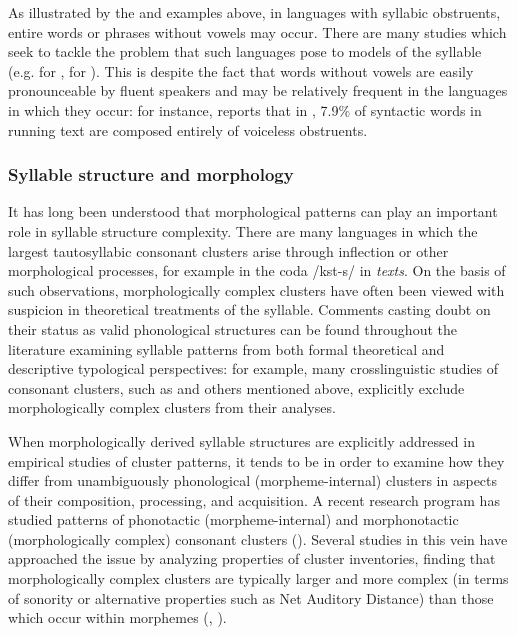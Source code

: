  As illustrated by the  and  examples above, in languages with syllabic obstruents, entire words or phrases without vowels may occur. There are many studies which seek to tackle the problem that such languages pose to models of the syllable (e.g. \citealt{Bagemihl1991} for , \citealt{Coleman2001} for ). This is despite the fact that words without vowels are easily pronounceable by fluent speakers and may be relatively frequent in the languages in which they occur: for instance, \citet[328f]{Ridouane2008} reports that in , 7.9\% of syntactic words in running text are composed entirely of voiceless obstruents. 

\subsubsection{{Syllable} {structure} {and} {morphology}}\label{sec:1.1.2.5}

  It has long been understood that morphological patterns can play an important role in syllable structure complexity. There are many languages in which the largest tautosyllabic consonant clusters arise through inflection or other morphological processes, for example in the coda /kst-s/ in  \textit{texts}. On the basis of such observations, morphologically complex clusters have often been viewed with suspicion in theoretical treatments of the syllable. Comments casting doubt on their status as valid phonological structures can be found throughout the literature examining syllable patterns from both formal theoretical and descriptive typological perspectives: for example, many crosslinguistic studies of consonant clusters, such as \citet{Greenberg19651978} and others mentioned above, explicitly exclude morphologically complex clusters from their analyses. 

  When morphologically derived syllable structures are explicitly addressed in empirical studies of cluster patterns, it tends to be in order to examine how they differ from unambiguously phonological (morpheme-internal) clusters in aspects of their composition, processing, and acquisition. A recent research program has studied patterns of phonotactic (morpheme-internal) and morphonotactic (morphologically complex) consonant clusters (\citealt{DresslerDziubalska-Kołaczyk2006}). Several studies in this vein have approached the issue by analyzing properties of cluster inventories, finding that morphologically complex clusters are typically larger and more complex (in terms of sonority or alternative properties such as Net Auditory Distance) than those which occur within morphemes (\citealt{DresslerDziubalska-Kołaczyk2006}, \citealt{Orzechowska2012}). 

